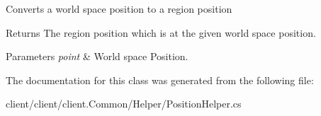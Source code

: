 Converts a world space position to a region position 

\begin{DoxyReturn}{Returns}
The region position which is at the given world space position.
\end{DoxyReturn}

\begin{DoxyParams}{Parameters}
{\em point} & World space Position.\\
\hline
\end{DoxyParams}


The documentation for this class was generated from the following file\+:\begin{DoxyCompactItemize}
\item 
client/client/client.\+Common/\+Helper/Position\+Helper.\+cs\end{DoxyCompactItemize}
